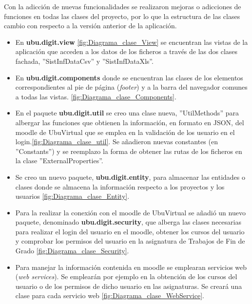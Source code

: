 
Con la adicción de nuevas funcionalidades se realizaron mejoras o adicciones de funciones en todas las clases del proyecto, por lo que la estructura de las clases cambio con respecto a la versión anterior de la aplicación.
\begin{itemize}
	\tightlist
	\item En \textbf{ubu.digit.view} \ref{fig:Diagrama_clase_View} se encuentran las vistas de la aplicación que acceden a los datos de los ficheros a través de las dos clases fachada, ''SistInfDataCsv'' y  ''SistInfDataXls''.
	
	\item En \textbf{ubu.digit.components} donde se encuentran las clases de los elementos correspondientes al pie de página (\emph{footer}) y a la barra del navegador comunes a todas las vistas. \ref{fig:Diagrama_clase_Components}. 
	
		
	\item En el paquete \textbf{ubu.digit.util} se creo una clase nueva, ''UtilMethods'' para albergar las funciones que obtienen la información, en formato en JSON, del moodle de UbuVirtual que se emplea en la validación de los usuario en el login.\ref{fig:Diagrama_clase_util}. Se añadieron nuevas constantes (en ''Constants'') y se reemplazo la forma de obtener las rutas de los ficheros en la clase ''ExternalProperties''.
	
	
	\item Se creo un nuevo paquete, \textbf{ubu.digit.entity}, para almacenar las entidades o clases donde se almacena la información respecto a los proyectos y los usuarios \ref{fig:Diagrama_clase_Entity}. 
	
	
	\item Para la realizar la conexión con el moodle de UbuVirtual se añadió un nuevo paquete, denominado \textbf{ubu.digit.security}, que alberga las clases necesarias para realizar el login del usuario en el moodle, obtener los cursos del usuario y comprobar los permisos del usuario en la asignatura de Trabajos de Fin de Grado \ref{fig:Diagrama_clase_Security}. 
	
	
	\item Para manejar la información contenida en moodle se emplearan servicios web (\emph{web services}). Se emplearán por ejemplo en la obtención de los cursos del usuario o de los permisos de dicho usuario en las asignaturas. Se creará una clase para cada servicio web  \ref{fig:Diagrama_clase_WebService}.
	
\end{itemize}


